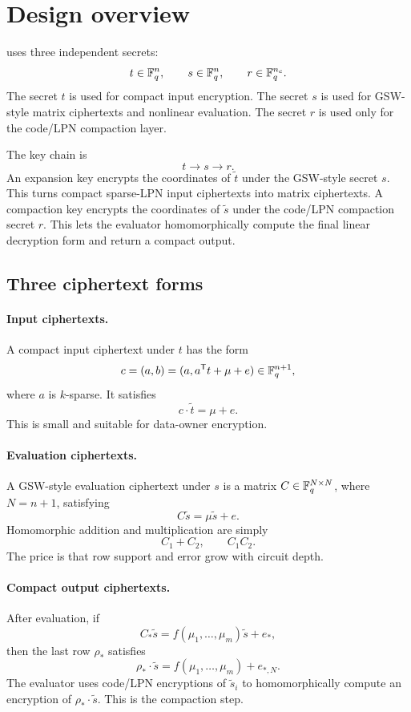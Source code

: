 \section{Design overview}

\sable{} uses three independent secrets:
\[
    t\in\mathbb{F}_q^n,\qquad s\in\mathbb{F}_q^n,
    \qquad r\in\mathbb{F}_q^{n_c}.
\]
The secret $t$ is used for compact input encryption.  The secret $s$ is used for GSW-style matrix ciphertexts and nonlinear evaluation.  The secret $r$ is used only for the code/LPN compaction layer.

The key chain is
\[
    t \longrightarrow s \longrightarrow r.
\]
An expansion key encrypts the coordinates of $\tilde{t}$ under the GSW-style secret $s$.  This turns compact sparse-LPN input ciphertexts into matrix ciphertexts.  A compaction key encrypts the coordinates of $\tilde{s}$ under the code/LPN compaction secret $r$.  This lets the evaluator homomorphically compute the final linear decryption form and return a compact output.

\subsection{Three ciphertext forms}

\paragraph{Input ciphertexts.}
A compact input ciphertext under $t$ has the form
\[
    c=(a,b)=(a,a^{\mathsf T} t+\mu+e)\in\mathbb{F}_q^{n+1},
\]
where $a$ is $k$-sparse.  It satisfies
\[
    c\cdot\tilde{t}=\mu+e.
\]
This is small and suitable for data-owner encryption.

\paragraph{Evaluation ciphertexts.}
A GSW-style evaluation ciphertext under $s$ is a matrix $C\in\mathbb{F}_q^{N\times N}$, where $N=n+1$, satisfying
\[
    C\tilde{s}=\mu\tilde{s}+e.
\]
Homomorphic addition and multiplication are simply
\[
    C_1+C_2,
    \qquad
    C_1C_2.
\]
The price is that row support and error grow with circuit depth.

\paragraph{Compact output ciphertexts.}
After evaluation, if
\[
    C_*\tilde{s}=f(\mu_1,\ldots,\mu_m)\tilde{s}+e_*,
\]
then the last row $\rho_*$ satisfies
\[
    \rho_*\cdot\tilde{s}=f(\mu_1,\ldots,\mu_m)+e_{*,N}.
\]
The evaluator uses code/LPN encryptions of $\tilde{s}_i$ to homomorphically compute an encryption of $\rho_*\cdot\tilde{s}$.  This is the compaction step.

